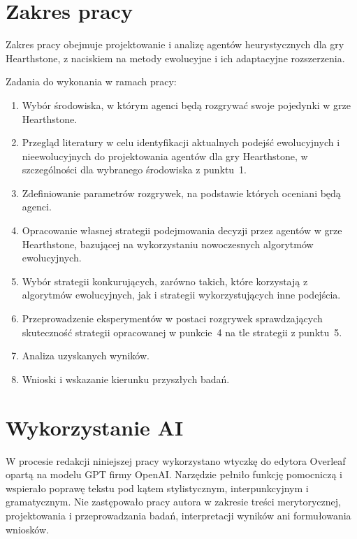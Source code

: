 \section{Zakres pracy}

Zakres pracy obejmuje projektowanie i analizę agentów heurystycznych dla gry Hearthstone, z naciskiem na metody ewolucyjne i ich adaptacyjne rozszerzenia.

Zadania do wykonania w ramach pracy:
\begin{enumerate}
    \item Wybór środowiska, w którym agenci będą rozgrywać swoje pojedynki w grze Hearthstone.
    \item Przegląd literatury w celu identyfikacji aktualnych podejść ewolucyjnych i nieewolucyjnych do projektowania agentów dla gry Hearthstone, w szczególności dla wybranego środowiska z punktu~1.
    \item Zdefiniowanie parametrów rozgrywek, na podstawie których oceniani będą agenci.
    \item Opracowanie własnej strategii podejmowania decyzji przez agentów w grze Hearthstone, bazującej na wykorzystaniu nowoczesnych algorytmów ewolucyjnych.
    \item Wybór strategii konkurujących, zarówno takich, które korzystają z algorytmów ewolucyjnych, jak i strategii wykorzystujących inne podejścia.
    \item Przeprowadzenie eksperymentów w postaci rozgrywek sprawdzających skuteczność strategii opracowanej w punkcie~4 na tle strategii z punktu~5.
    \item Analiza uzyskanych wyników.
    \item Wnioski i wskazanie kierunku przyszłych badań.
\end{enumerate}

\section{Wykorzystanie AI}

W procesie redakcji niniejszej pracy wykorzystano wtyczkę do edytora Overleaf opartą na modelu GPT firmy OpenAI. Narzędzie pełniło funkcję pomocniczą i wspierało poprawę tekstu pod kątem stylistycznym, interpunkcyjnym i gramatycznym. Nie zastępowało pracy autora w zakresie treści merytorycznej, projektowania i przeprowadzania badań, interpretacji wyników ani formułowania wniosków.

